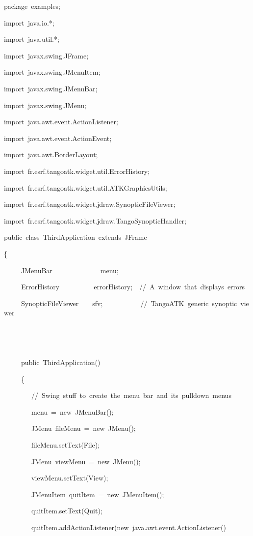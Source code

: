 
\begin{lyxcode}
package~examples;

import~java.io.{*};

import~java.util.{*};

import~javax.swing.JFrame;

import~javax.swing.JMenuItem;

import~javax.swing.JMenuBar;

import~javax.swing.JMenu;

import~java.awt.event.ActionListener;

import~java.awt.event.ActionEvent;

import~java.awt.BorderLayout;

import~fr.esrf.tangoatk.widget.util.ErrorHistory;

import~fr.esrf.tangoatk.widget.util.ATKGraphicsUtils;

import~fr.esrf.tangoatk.widget.jdraw.SynopticFileViewer;

import~fr.esrf.tangoatk.widget.jdraw.TangoSynopticHandler;

public~class~ThirdApplication~extends~JFrame

\{

~~~~~JMenuBar~~~~~~~~~~~~~~menu;

~~~~~ErrorHistory~~~~~~~~~~errorHistory;~~//~A~window~that~displays~errors

~~~~~SynopticFileViewer~~~~sfv;~~~~~~~~~~~//~TangoATK~generic~synoptic~viewer

~~~~~

~~~~~

~~~~~public~ThirdApplication()

~~~~~\{

~~~~~~~~//~Swing~stuff~to~create~the~menu~bar~and~its~pulldown~menus

~~~~~~~~menu~=~new~JMenuBar();

~~~~~~~~JMenu~fileMenu~=~new~JMenu();

~~~~~~~~fileMenu.setText(\textquotedbl{}File\textquotedbl{});~~~

~~~~~~~~JMenu~viewMenu~=~new~JMenu();

~~~~~~~~viewMenu.setText(\textquotedbl{}View\textquotedbl{});

~~~~~~~~JMenuItem~quitItem~=~new~JMenuItem();

~~~~~~~~quitItem.setText(\textquotedbl{}Quit\textquotedbl{});

~~~~~~~~quitItem.addActionListener(new~java.awt.event.ActionListener()


\end{lyxcode}
